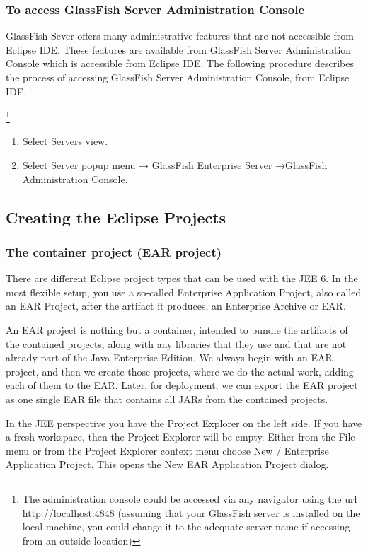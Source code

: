 \subsubsection{To access GlassFish Server Administration Console}
GlassFish Sever offers many administrative features that are not accessible from Eclipse IDE.
These features are available from GlassFish Server Administration Console which is accessible
from Eclipse IDE. The following procedure describes the process of accessing GlassFish Server
Administration Console, from Eclipse IDE.

\footnote{The administration console could be accessed via any navigator using the url http://localhost:4848 (assuming that your GlassFish server is installed on the local machine, you could change it to the adequate server name if accessing from an outside location)}

\begin{enumerate}
\item Select Servers view.
\item Select Server popup menu → GlassFish Enterprise Server →GlassFish Administration Console.
\end{enumerate}

\subsection{Creating the Eclipse Projects}
\subsubsection{The container project (EAR project)}
There are different Eclipse project types that can be used with the JEE 6. In the most flexible setup, you use a so-called Enterprise Application Project, also called an EAR Project, after the artifact it produces, an Enterprise Archive or EAR.

An EAR project is nothing but a container, intended to bundle the artifacts of the contained projects, along with any libraries that they use and that are not already part of the Java Enterprise Edition. We always begin with an EAR project, and then we create those projects, where we do the actual work, adding each of them to the EAR. Later, for deployment, we can export the EAR project as one single EAR file that contains all JARs from the contained projects.

In the JEE perspective you have the Project Explorer on the left side. If you have a fresh workspace, then the Project Explorer will be empty. Either from the File menu or from the Project Explorer context menu choose New / Enterprise Application Project. This opens the New EAR Application Project dialog.

